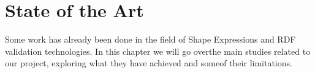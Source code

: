 \setchapterpreamble[u]{\margintoc}
\chapter{State of the Art}

Some work has already been done in the field of Shape Expressions and RDF validation technologies. In this chapter we will go overthe main studies related to our project, exploring what they have achieved and someof their limitations.



